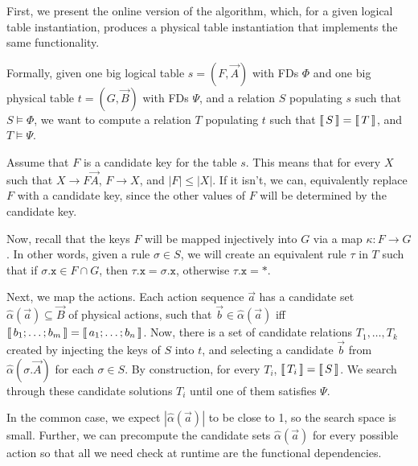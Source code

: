First, we present the online version of the algorithm, which, for a
given logical table instantiation, produces a physical table
instantiation that implements the same functionality.

Formally, given one big logical table $s = (F, \vec A)$ with FDs $\Phi$ and
one big physical table $t = (G, \vec B)$ with FDs $\Psi$, and a relation
$S$ populating $s$ such that $S \models \Phi$, we want to compute a
relation $T$ populating $t$ such that $\llbracket\,S\,\rrbracket = \llbracket\,T\,\rrbracket$, and $T
\models \Psi$. 

Assume that $F$ is a candidate key for the table $s$. This means that
for every $X$ such that $X \longrightarrow F\vec A$,
$F \longrightarrow X$, and $|F| \leq |X|$. If it isn't, we can,
equivalently replace $F$ with a candidate key, since the other values
of $F$ will be determined by the candidate key.

Now, recall that the keys $F$ will be mapped injectively into $G$ via
a map $\kappa : F \to G$. In other words, given a rule $\sigma \in S$,
we will create an equivalent rule $\tau$ in $T$ such that if
$\sigma.\texttt{x} \in F \cap G$, then
$\tau.\texttt{x} = \sigma.\texttt{x}$, otherwise
$\tau.\texttt{x} = *$.

Next, we map the actions. Each action sequence $\vec a$ has a
candidate set $\hat\alpha(\vec a) \subseteq \vec B$ of physical
actions, such that $\vec b \in \hat\alpha(\vec a)$ iff
$\llbracket\,b_1;\ldots;b_m\,\rrbracket = \llbracket\,a_1;\ldots;b_n\,\rrbracket$. Now, there is a
set of candidate relations $T_1,\ldots, T_k$ created by injecting the
keys of $S$ into $t$, and selecting a candidate $\vec b$ from
$\hat \alpha(\sigma.\vec A)$ for each $\sigma \in S$. By construction,
for every $T_i$, $\llbracket\,T_i\,\rrbracket = \llbracket\,S\,\rrbracket$. We search through these
candidate solutions $T_i$ until one of them satisfies $\Psi$.

In the common case, we expect $|\hat\alpha(\vec a)|$ to be close to 1,
so the search space is small. Further, we can precompute the candidate
sets $\hat \alpha(\vec a)$ for every possible action so that all we
need check at runtime are the functional dependencies.



